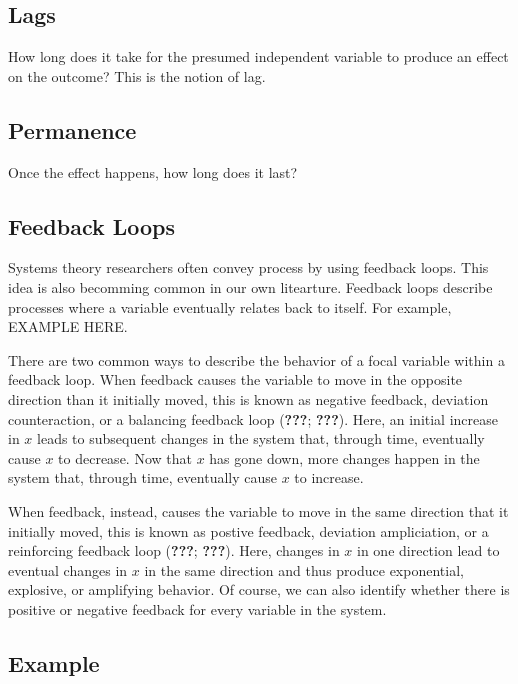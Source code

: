 \documentclass[english,,man]{apa6}
\theoremstyle{definition}
\theoremstyle{definition}
\theoremstyle{definition}
\theoremstyle{remark}
\begin{document}
\hypertarget{lags}{%
\subsection{Lags}\label{lags}}

How long does it take for the presumed independent variable to produce
an effect on the outcome? This is the notion of lag.

\hypertarget{permanence}{%
\subsection{Permanence}\label{permanence}}

Once the effect happens, how long does it last?

\hypertarget{feedback-loops}{%
\subsection{Feedback Loops}\label{feedback-loops}}

Systems theory researchers often convey process by using feedback loops.
This idea is also becomming common in our own litearture. Feedback loops
describe processes where a variable eventually relates back to itself.
For example, EXAMPLE HERE.

There are two common ways to describe the behavior of a focal variable
within a feedback loop. When feedback causes the variable to move in the
opposite direction than it initially moved, this is known as negative
feedback, deviation counteraction, or a balancing feedback loop
({\textbf{???}}; {\textbf{???}}). Here, an initial increase in \(x\)
leads to subsequent changes in the system that, through time, eventually
cause \(x\) to decrease. Now that \(x\) has gone down, more changes
happen in the system that, through time, eventually cause \(x\) to
increase.

When feedback, instead, causes the variable to move in the same
direction that it initially moved, this is known as postive feedback,
deviation ampliciation, or a reinforcing feedback loop ({\textbf{???}};
{\textbf{???}}). Here, changes in \(x\) in one direction lead to
eventual changes in \(x\) in the same direction and thus produce
exponential, explosive, or amplifying behavior. Of course, we can also
identify whether there is positive or negative feedback for every
variable in the system.

\hypertarget{example}{%
\subsection{Example}\label{example}}
\end{document}
